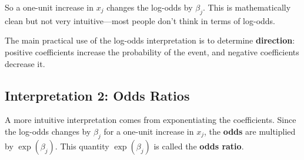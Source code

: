 \documentclass[
  letterpaper,
  DIV=11,
  numbers=noendperiod]{scrreprt}
\begin{document}
So a one-unit increase in \(x_j\) changes the log-odds by \(\beta_j\).
This is mathematically clean but not very intuitive---most people don't
think in terms of log-odds.

The main practical use of the log-odds interpretation is to determine
\textbf{direction}: positive coefficients increase the probability of
the event, and negative coefficients decrease it.

\subsection{Interpretation 2: Odds
Ratios}\label{interpretation-2-odds-ratios}

A more intuitive interpretation comes from exponentiating the
coefficients. Since the log-odds changes by \(\beta_j\) for a one-unit
increase in \(x_j\), the \textbf{odds} are multiplied by
\(\exp(\beta_j)\). This quantity \(\exp(\beta_j)\) is called the
\textbf{odds ratio}.
\end{document}

